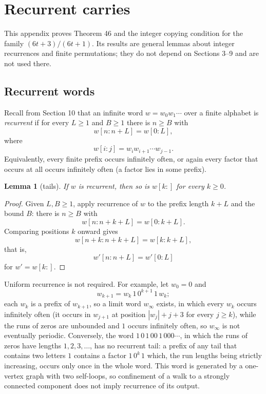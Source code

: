 \documentclass[11pt,reqno]{amsart}
\newtheorem{lemma}[theorem]{Lemma}
\theoremstyle{definition}
\theoremstyle{remark}
\begin{document}
\section{Recurrent carries}\label{app:B}

This appendix proves Theorem 46 and the integer copying condition for
the family \((6t+3)/(6t+1)\). Its results are general lemmas about
integer recurrences and finite permutations; they do not depend on
Sections 3--9 and are not used there.

\subsection{Recurrent words}\label{sec:B.1}

Recall from Section 10 that an infinite word \(w=w_0w_1\cdots\) over a
finite alphabet is \emph{recurrent} if for every \(L\ge1\) and \(B\ge1\)
there is \(n\ge B\) with
\[
w[n:n+L]=w[0:L],
\]
where
\[
w[i:j]=w_iw_{i+1}\cdots w_{j-1}.
\]
Equivalently, every finite prefix
occurs infinitely often, or again every factor that occurs at all occurs
infinitely often (a factor lies in some prefix).

\begin{samepage}
\begin{lemma}[tails]\leavevmode\label{thm:48}
If \(w\) is recurrent, then so is \(w[k:]\) for
every \(k\ge0\).
\label{thm-end:48}
\end{lemma}
\end{samepage}

\begin{proof}\leavevmode\label{proof:48}
Given \(L,B\ge1\), apply recurrence of \(w\) to the prefix
length \(k+L\) and the bound \(B\): there is \(n\ge B\) with
\[
w[n:n+k+L]=w[0:k+L].
\]
Comparing positions \(k\) onward gives
\[
w[n+k:n+k+L]=w[k:k+L],
\]
that is,
\[
w'[n:n+L]=w'[0:L]
\]
for
\(w'=w[k:]\). \qedhere
\end{proof}

Uniform recurrence is not required. For example, let \(w_0=0\) and
\[
w_{k+1}=w_k\,1\,0^{k+1}\,1\,w_k;
\]
each \(w_k\) is a prefix of
\(w_{k+1}\), so a limit word \(w_\infty\) exists, in which every \(w_k\)
occurs infinitely often (it occurs in \(w_{j+1}\) at position
\(|w_j|+j+3\) for every \(j\ge k\)), while the runs of zeros are
unbounded and \(1\) occurs infinitely often, so \(w_\infty\) is not
eventually periodic. Conversely, the word \(1\,0\,1\,00\,1\,000\cdots\),
in which the runs of zeros have lengths \(1,2,3,\ldots\), has no
recurrent tail: a prefix of any tail that contains two letters \(1\)
contains a factor \(1\,0^k\,1\) which, the run lengths being strictly
increasing, occurs only once in the whole word. This word is generated by
a one-vertex graph with two self-loops, so confinement of a walk to a
strongly connected component does not imply recurrence of its output.
\end{document}
